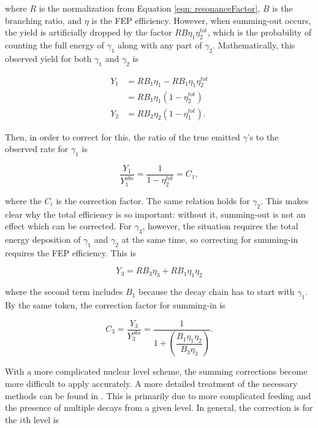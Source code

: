 \noindent where $R$ is the normalization from Equation \ref{eqn: resonanceFactor}, $B$ is the branching ratio, and $\eta$ is the FEP efficiency. However, when summing-out occurs, the yield is artificially dropped by the factor $R B \eta_{1} \eta^{tot}_{2}$, which is the probability of counting the full energy of $\gamma_{1}$ along with any part of $\gamma_{2}$. Mathematically, this observed yield for both $\gamma_{1}$ and $\gamma_{2}$ is

\begin{align}
Y_{1} &= R B_{1} \eta_{1} - R B_{1} \eta_{1} \eta^{tot}_{2} \\
        &= R B_{1} \eta_{1} \left( 1 - \eta^{tot}_{2} \right) \\
Y_{2} &= R B_{2} \eta_{2} \left( 1 - \eta^{tot}_{1} \right).
\end{align}

\noindent Then, in order to correct for this, the ratio of the true emitted $\gamma$'s to the observed rate for $\gamma_{1}$ is

\begin{equation}
\dfrac{Y_{1}}{Y^{obs}_{1}} = \dfrac{1}{1 - \eta^{tot}_{2}} = C_{1},
\end{equation}

\noindent where the $C_{i}$ is the correction factor. The same relation holds for $\gamma_{2}$. This makes clear why the total efficiency is so important: without it, summing-out is not an effect which can be corrected. For $\gamma_{3}$, however, the situation requires the total energy deposition of $\gamma_{1}$ and $\gamma_{2}$ at the same time, so correcting for summing-in requires the FEP efficiency. This is

\begin{equation}
Y_{3} = R B_{3} \eta_{3} + R B_{1} \eta_{1} \eta_{2}
\end{equation} 

\noindent where the second term includes $B_{1}$ because the decay chain has to start with $\gamma_{1}$. By the same token, the correction factor for summing-in is

\begin{equation}
C_{3} = \dfrac{Y_{3}}{Y_{3}^{obs}} = \dfrac{1}{1 + \left( \dfrac{B_{1} \eta_{1} \eta_{2}} {B_{3} \eta_{3}}  \right)}.
\end{equation}


With a more complicated nuclear level scheme, the summing corrections become more difficult to apply accurately. A more detailed treatment of the necessary methods can be found in \cite{DebertinHelmerBook}. This is primarily due to more complicated feeding and the presence of multiple decays from a given level. In general, the correction is for the $i$th level is

